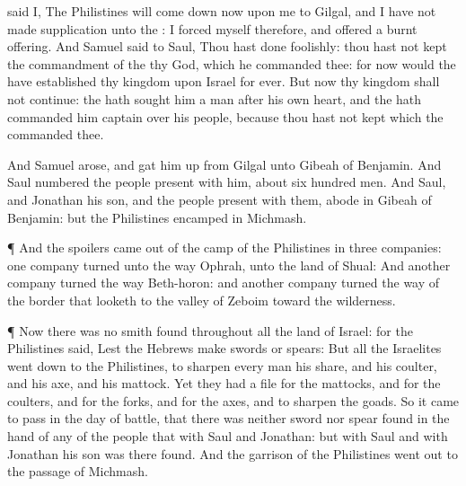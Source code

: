 {said I, The
Philistines will come
down now upon me to
Gilgal, and I have not made
supplication
unto the
{}: I
forced myself therefore, and
offered a burnt
offering.
And
Samuel
said to
Saul, Thou hast done
foolishly: thou hast not
kept the
commandment of the
{} thy
God, which he
commanded thee: for now would the
{} have
established thy
kingdom upon
Israel
for
ever.
But now thy
kingdom shall not
continue: the
{} hath
sought him a
man after his own
heart, and the
{} hath
commanded him
{}
captain over his
people, because thou hast not
kept
{} which the
{}
commanded thee.
\par }{\PP {}And
Samuel
arose, and gat him
up from
Gilgal unto
Gibeah of
Benjamin. And
Saul
numbered the
people
{}
present with him, about
six
hundred
men.
And
Saul, and
Jonathan his
son, and the
people
{}
present with them,
abode in
Gibeah of
Benjamin: but the
Philistines
encamped in
Michmash.
\par }{\PP {}¶ And the
spoilers came
out of the
camp of the
Philistines in
three
companies:
one
company
turned unto the
way
{}
Ophrah, unto the
land of
Shual:
And
another
company
turned the
way
{}
Beth-horon: and
another
company
turned
{} the
way of the
border that
looketh to the
valley of
Zeboim toward the
wilderness.
\par }{\PP {}¶ Now there was no
smith
found throughout all the
land of
Israel: for the
Philistines
said, Lest the
Hebrews
make
{}
swords or
spears:
But all the
Israelites went
down to the
Philistines, to
sharpen every
man his
share, and his
coulter, and his
axe, and his
mattock.
Yet they had a
file for the
mattocks, and for the
coulters, and for the
forks, and for the
axes, and to
sharpen the
goads.
So it came to pass in the
day of
battle, that there was neither
sword nor
spear
found in the
hand of any of the
people that
{} with
Saul and
Jonathan: but with
Saul and with
Jonathan his
son was there
found.
And the
garrison of the
Philistines went
out to the
passage of
Michmash.

}
